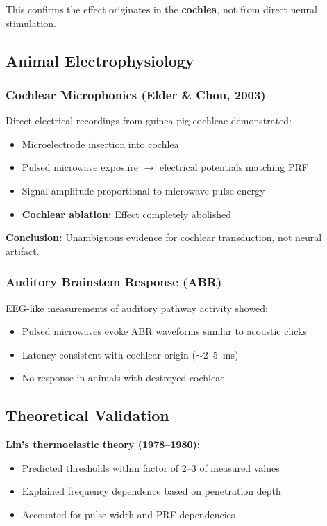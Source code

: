 This confirms the effect originates in the \textbf{cochlea}, not from direct neural stimulation.

\subsection{Animal Electrophysiology}

\subsubsection{Cochlear Microphonics (Elder \& Chou, 2003)}

Direct electrical recordings from guinea pig cochleae demonstrated:
\begin{itemize}
\item Microelectrode insertion into cochlea
\item Pulsed microwave exposure $\rightarrow$ electrical potentials matching PRF
\item Signal amplitude proportional to microwave pulse energy
\item \textbf{Cochlear ablation:} Effect completely abolished
\end{itemize}

\textbf{Conclusion:} Unambiguous evidence for cochlear transduction, not neural artifact.

\subsubsection{Auditory Brainstem Response (ABR)}

EEG-like measurements of auditory pathway activity showed:
\begin{itemize}
\item Pulsed microwaves evoke ABR waveforms similar to acoustic clicks
\item Latency consistent with cochlear origin ($\sim$2--5~ms)
\item No response in animals with destroyed cochleae
\end{itemize}

\subsection{Theoretical Validation}

\textbf{Lin's thermoelastic theory (1978--1980):}
\begin{itemize}
\item Predicted thresholds within factor of 2--3 of measured values
\item Explained frequency dependence based on penetration depth
\item Accounted for pulse width and PRF dependencies
\end{itemize}

